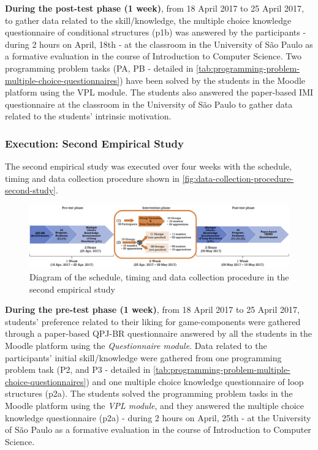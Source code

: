 \textbf{During the post-test phase (1 week)}, from 18 April 2017 to 25 April 2017, to gather data related to the skill/knowledge, the multiple choice knowledge questionnaire of conditional structures (p1b) was answered by the participants - during 2 hours on April, 18th - at the classroom in the University of São Paulo as a formative evaluation in the course of Introduction to Computer Science. Two programming problem tasks (PA, PB - detailed in \autoref{tab:programming-problem-multiple-choice-questionnaires}) have been solved by the students in the Moodle platform using the VPL module. The students also answered the paper-based IMI questionnaire at the classroom in the University of São Paulo to gather data related to the students' intrinsic motivation. 

\subsubsection{Execution: Second Empirical Study}

The second empirical study was executed over four weeks with the schedule, timing and data collection procedure shown in \autoref{fig:data-collection-procedure-second-study}.

\begin{figure}[htb]
 \caption{Diagram of the schedule, timing and data collection procedure in the second empirical study}
 \label{fig:data-collection-procedure-second-study}
 \centering
 \includegraphics[width=1\textwidth]{images/chap-evaluation/data-collection-procedure-second-study.png}
 \fautor
\end{figure}

\textbf{During the pre-test phase (1 week)}, from 18 April 2017 to 25 April 2017, students' preference related to their liking for game-components were gathered through a paper-based QPJ-BR questionnaire answered by all the students in the Moodle platform using the \emph{Questionnaire module}. Data related to the participants' initial skill/knowledge were gathered from one programming problem task (P2, and P3 - detailed in \autoref{tab:programming-problem-multiple-choice-questionnaires}) and one multiple choice knowledge questionnaire of loop structures (p2a). The students solved the programming problem tasks in the Moodle platform using the \emph{VPL module}, and they answered the multiple choice knowledge questionnaire (p2a) - during 2 hours on April, 25th - at the University of São Paulo as a formative evaluation in the course of Introduction to Computer Science. 

